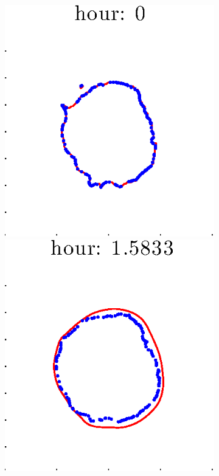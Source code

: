 \documentclass[12pt]{article}
\begin{document}
\begin{figure}[h!]
\centering
	\begin{subfigure}[b]{.3\textwidth}
	\centering
		\includegraphics[height=.15\textheight]{Pos0/full/full1.eps}
		\includegraphics[height=.15\textheight]{Pos0/full/full2.eps}

\end{subfigure}
\end{figure}
\end{document}
